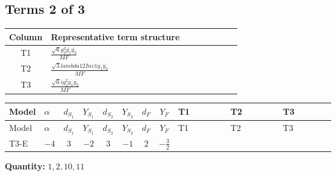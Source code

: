 \documentclass[8pt]{article}
\begin{document}
\begin{landscape}
\subsection*{Terms 2 of 3}
\begin{center}
\begin{tabular}{@{}c >{\raggedright\arraybackslash}p{0.82\linewidth}@{}}
\toprule
Column & Representative term structure \\
\midrule
T1 & \(\displaystyle \frac{\sqrt{6} g_{2}^{2} \overline{y_{1}} \overline{y_{2}}}{MF}\) \\
\midrule
T2 & \(\displaystyle \frac{\sqrt{3} lambda12Inv1 \overline{y_{1}} \overline{y_{2}}}{MF}\) \\
\midrule
T3 & \(\displaystyle \frac{\sqrt{6} i g_{2}^{2} \overline{y_{1}} \overline{y_{2}}}{MF}\) \\
\midrule
\bottomrule
\end{tabular}
\end{center}
\smallskip
\tiny
\begin{longtable}{@{}llcccccc >{\raggedright\arraybackslash}p{0.21\linewidth} >{\raggedright\arraybackslash}p{0.21\linewidth} >{\raggedright\arraybackslash}p{0.21\linewidth}@{}}
\toprule
Model & $\alpha$ & $d_{S_1}$ & $Y_{S_1}$ & $d_{S_2}$ & $Y_{S_2}$ & $d_F$ & $Y_F$ & T1 & T2 & T3 \\
\midrule
\endfirsthead
\toprule
Model & $\alpha$ & $d_{S_1}$ & $Y_{S_1}$ & $d_{S_2}$ & $Y_{S_2}$ & $d_F$ & $Y_F$ & T1 & T2 & T3 \\
\midrule
\endhead
T3-E & $-4$ & $3$ & $-2$ & $3$ & $-1$ & $2$ & $-\frac{3}{2}$ & \scriptsize\adjustbox{max width=\linewidth}{$\begin{gathered} - \frac{\sqrt{6} g_{2}^{2} \overline{y_{1}} \overline{y_{2}}}{6 MF}\end{gathered}$} & \scriptsize\adjustbox{max width=\linewidth}{$\begin{gathered} \frac{\sqrt{3} lambda12Inv1 \overline{y_{1}} \overline{y_{2}}}{6 MF}\end{gathered}$} & \scriptsize\adjustbox{max width=\linewidth}{$\begin{gathered} \frac{\sqrt{6} i g_{2}^{2} \overline{y_{1}} \overline{y_{2}}}{6 MF}\end{gathered}$} \\
\midrule
\bottomrule
\end{longtable}
\clearpage
\noindent\textbf{Quantity: }$\mathrm{1,2,10,11}$\par\smallskip

\end{landscape}
\end{document}
